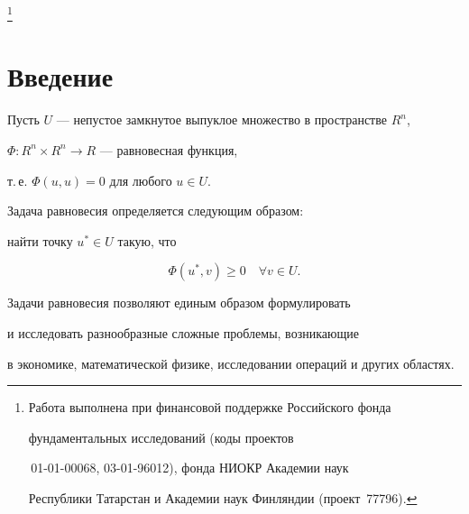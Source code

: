 \thanks{Работа выполнена при финансовой поддержке Российского фонда 


фундаментальных исследований (коды проектов


\No\No\,01-01-00068, 03-01-96012), фонда НИОКР Академии наук 


Республики Татарстан и Академии наук Финляндии (проект \No\,77796).}





\date{}




\pagestyle{plain} %







\maketitle


\label{begin}











\section{Введение}





Пусть $U$ --- непустое замкнутое выпуклое множество в пространстве $R^n$,


$\Phi : R^n \times R^n \rightarrow R$ --- равновесная функция,


т.\,е. $\Phi(u,u)=0$ для любого $u \in U$. 


Задача равновесия определяется следующим образом: 


найти точку $u^* \in U$ такую, что


$$


\Phi(u^*,v) \ge 0 \quad \forall v \in U.


$$


Задачи равновесия позволяют единым образом формулировать 


и исследовать разнообразные сложные проблемы, возникающие 


в экономике, математической физике, исследовании операций и других областях.


